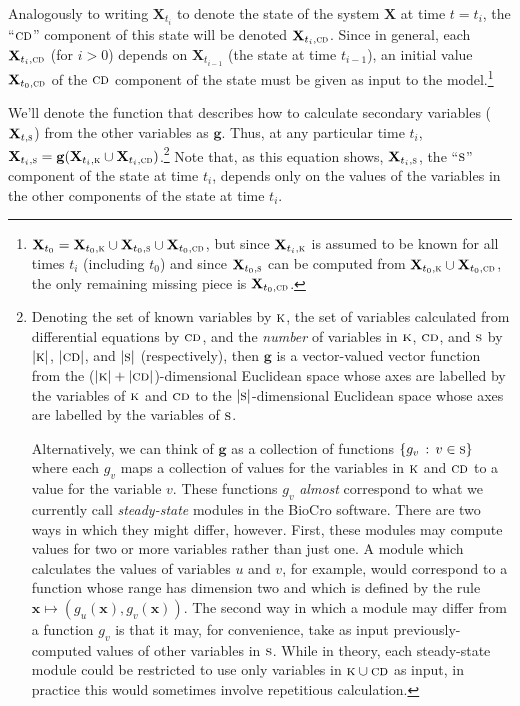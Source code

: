 \documentclass{article}\usepackage[]{graphicx}\usepackage[]{color}
\newcommand{\boldX}{\mathbf{X}}
\newcommand{\cd}{\textsc{cd}}
\newcommand{\kn}{\textsc{k}} %
\newcommand{\s}{\textsc{s}} %
\newcommand{\g}{\mathbf{g}}
\begin{document}
Analogously to writing $\boldX_{t_i}$ to denote the state of the
system $\boldX$ at time $t = t_i$, the ``$\cd$'' component of this
state will be denoted $\boldX_{t_i, \cd}$.  Since in general, each
$\boldX_{t_i, \cd}$ (for $i > 0$) depends on $\boldX_{t_{i-1}}$ (the
state at time $t_{i-1}$), an initial value $\boldX_{t_0, \cd}$ of the
$\cd$ component of the state must be given as input to the
model.\footnote{$\boldX_{t_0} = \boldX_{t_0, \kn} \cup \boldX_{t_0,
    \s} \cup \boldX_{t_0, \cd}$, but since $\boldX_{t_i, \kn}$ is
  assumed to be known for all times $t_i$ (including $t_0$) and since
  $\boldX_{t_0, \s}$ can be computed from $\boldX_{t_0, \kn} \cup
  \boldX_{t_0, \cd}$, the only remaining missing piece is
  $\boldX_{t_0, \cd}$.}

We'll denote the function that describes how to calculate secondary
variables ($\boldX_{t,\s}$) from the other variables as $\g$. Thus, at
any particular time $t_i$, $\boldX_{t_i,\s} = \g(\boldX_{t_i,\kn} \cup
\boldX_{t_i,\cd})$.\footnote{Denoting the set of known variables by
  $\kn$, the set of variables calculated from differential equations
  by $\cd$, and the \emph{number} of variables in $\kn$, $\cd$, and
  $\s$ by $|\kn|$, $|\cd|$, and $|\s|$ (respectively), then
  $\mathbf{g}$ is a vector-valued vector function from the
  ($|\kn|+|\cd|$)-dimensional Euclidean space whose axes are labelled
  by the variables of $\kn$ and $\cd$ to the $|\s|$-dimensional
  Euclidean space whose axes are labelled by the variables of $\s$.

  Alternatively, we can think of $\mathbf{g}$ as a collection of
  functions $\{g_v\,:\,v\in \s\}$ where each $g_v$ maps a collection
  of values for the variables in $\kn$ and $\cd$ to a value for the
  variable $v$.  These functions $g_v$ \emph{almost} correspond to
  what we currently call \emph{steady-state} modules in the BioCro
  software.  There are two ways in which they might differ, however.
  First, these modules may compute values for two or more variables
  rather than just one.  A module which calculates the values of
  variables $u$ and $v$, for example, would correspond to a function
  whose range has dimension two and which is defined by the rule
  $\mathbf{x}\mapsto(g_u(\mathbf{x}), g_v(\mathbf{x}))$.  The second
  way in which a module may differ from a function $g_v$ is that it
  may, for convenience, take as input previously-computed values of
  other variables in $\s$.  While in theory, each steady-state module
  could be restricted to use only variables in $\kn \cup \cd$ as
  input, in practice this would sometimes involve repetitious
  calculation.}  Note that, as this equation shows, $\boldX_{t_i,\s}$,
the ``$\s$'' component of the state at time $t_i$, depends only on the
values of the variables in the other components of the state at time
$t_i$.
\end{document}
